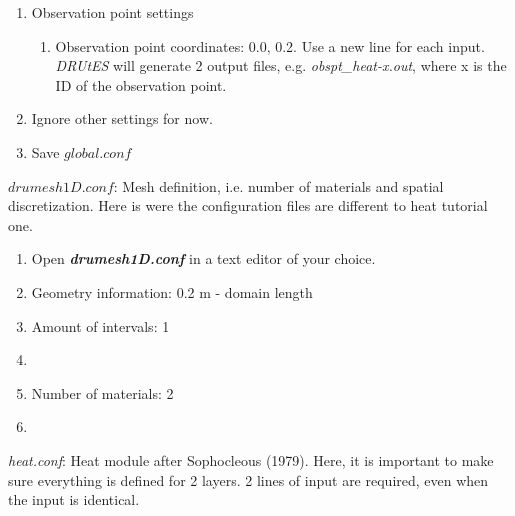 \documentclass[
10pt, %
a4paper, %
oneside, %
headinclude,footinclude, %
BCOR5mm, %
]{scrartcl}
\begin{document}
\begin{enumerate}
\begin{enumerate}
\end{enumerate}
\item Observation point settings \begin{enumerate}
\item Observation point coordinates: 0.0, 0.2. Use a new line for each input. \textit{DRUtES} will generate 2 output files, e.g. \textit{obspt\_heat-x.out}, where x is the ID of the observation point. 
\end{enumerate}
\item Ignore other settings for now. 
\item Save $global.conf$
\end{enumerate}


$drumesh1D.conf$: Mesh definition, i.e. number of materials and spatial discretization. Here is were the configuration files are different to heat tutorial one. 
\begin{enumerate}
\item Open \textbf{\emph{drumesh1D.conf}} in a text editor of your choice. 
\item Geometry information: 0.2 m - domain length
\item Amount of intervals: 1
\item
{}
\item Number of materials: 2
\item {}
\end{enumerate}

\emph{heat.conf}: Heat module after Sophocleous (1979). 
Here, it is important to make sure everything is defined for 2 layers. 2 lines of input are required, even when the input is identical. 
\end{document}
